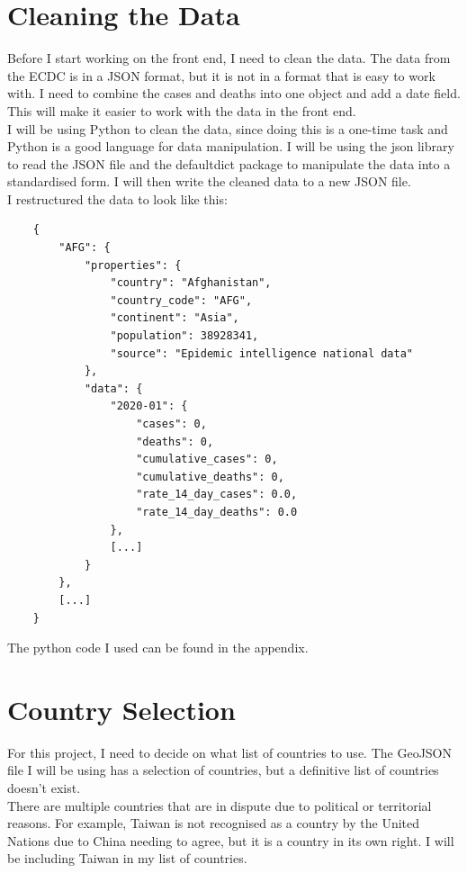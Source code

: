 \documentclass{report}
\begin{document}
\newpage
\section{Cleaning the Data}
Before I start working on the front end, I need to clean the data. The data from the ECDC is in a JSON format, but it is not in a format that is easy to work with. I need to combine the cases and deaths into one object and add a date field. This will make it easier to work with the data in the front end.\\

I will be using Python to clean the data, since doing this is a one-time task and Python is a good language for data manipulation. I will be using the json library to read the JSON file and the defaultdict package to manipulate the data into a standardised form. I will then write the cleaned data to a new JSON file.\\

I restructured the data to look like this:
\begin{center}
    \begin{lstlisting}
    {
        "AFG": {
            "properties": {
                "country": "Afghanistan",
                "country_code": "AFG",
                "continent": "Asia",
                "population": 38928341,
                "source": "Epidemic intelligence national data"
            },
            "data": {
                "2020-01": {
                    "cases": 0,
                    "deaths": 0,
                    "cumulative_cases": 0,
                    "cumulative_deaths": 0,
                    "rate_14_day_cases": 0.0,
                    "rate_14_day_deaths": 0.0
                },
                [...]
            }
        },
        [...]
    }
    \end{lstlisting}
\end{center}
The python code I used can be found in the appendix.

\section{Country Selection}
For this project, I need to decide on what list of countries to use. The GeoJSON file I will be using has a selection of countries, but a definitive list of countries doesn't exist.\\

There are multiple countries that are in dispute due to political or territorial reasons. For example, Taiwan is not recognised as a country by the United Nations due to China needing to agree, but it is a country in its own right. I will be including Taiwan in my list of countries.\\
\end{document}
